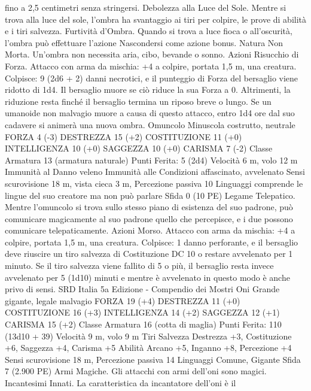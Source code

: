 \begin{multicols}{2}
fino a 2,5 centimetri senza stringersi.
Debolezza alla Luce del Sole. Mentre si trova alla luce del sole,
l’ombra ha svantaggio ai tiri per colpire, le prove di abilità e i tiri
salvezza.
Furtività d’Ombra. Quando si trova a luce fioca o all’oscurità,
l’ombra può effettuare l’azione Nascondersi come azione bonus.
Natura Non Morta. Un’ombra non necessita aria, cibo, bevande
o sonno.
Azioni
Risucchio di Forza. Attacco con arma da mischia: +4 a colpire,
portata 1,5 m, una creatura.
Colpisce: 9 (2d6 + 2) danni necrotici, e il punteggio di Forza del
bersaglio viene ridotto di 1d4. Il bersaglio muore se ciò riduce la
sua Forza a 0. Altrimenti, la riduzione resta finché il bersaglio
termina un riposo breve o lungo.
Se un umanoide non malvagio muore a causa di questo attacco,
entro 1d4 ore dal suo cadavere si animerà una nuova ombra.
Omuncolo
Minuscola costrutto, neutrale
FORZA 4 (-3)
DESTREZZA 15 (+2)
COSTITUZIONE 11 (+0)
INTELLIGENZA 10 (+0)
SAGGEZZA 10 (+0)
CARISMA 7 (-2)
Classe Armatura 13 (armatura naturale)
\hspace*{0pt}\hfill{Punti Ferita}: 5 (2d4)
Velocità 6 m, volo 12 m
Immunità al Danno veleno
Immunità alle Condizioni affascinato, avvelenato
Sensi scurovisione 18 m, vista cieca 3 m, Percezione passiva 10
Linguaggi comprende le lingue del suo creatore ma non può
parlare
Sfida 0 (10 PE)
Legame Telepatico. Mentre l’omuncolo si trova sullo stesso piano
di esistenza del suo padrone, può comunicare magicamente al suo
padrone quello che percepisce, e i due possono comunicare
telepaticamente.
Azioni
Morso. Attacco con arma da mischia: +4 a colpire, portata 1,5
m, una creatura.
Colpisce: 1 danno perforante, e il bersaglio deve riuscire un tiro
salvezza di Costituzione DC 10 o restare avvelenato per 1
minuto. Se il tiro salvezza viene fallito di 5 o più, il bersaglio
resta invece avvelenato per 5 (1d10) minuti e mentre è
avvelenato in questo modo è anche privo di sensi.
SRD Italia 5a Edizione - Compendio dei Mostri
Oni
Grande gigante, legale malvagio
FORZA 19 (+4)
DESTREZZA 11 (+0)
COSTITUZIONE 16 (+3)
INTELLIGENZA 14 (+2)
SAGGEZZA 12 (+1)
CARISMA 15 (+2)
Classe Armatura 16 (cotta di maglia)
\hspace*{0pt}\hfill{Punti Ferita}: 110 (13d10 + 39)
Velocità 9 m, volo 9 m
Tiri Salvezza Destrezza +3, Costituzione +6, Saggezza +4,
Carisma +5
Abilità Arcano +5, Inganno +8, Percezione +4
Sensi scurovisione 18 m, Percezione passiva 14
Linguaggi Comune, Gigante
Sfida 7 (2.900 PE)
Armi Magiche. Gli attacchi con armi dell’oni sono magici.
Incantesimi Innati. La caratteristica da incantatore dell’oni è il

\end{multicols}
